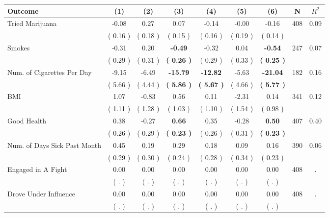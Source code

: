 \begin{tabular}{lcccccccc}
\toprule
 \textbf{Outcome} & \textbf{(1)} & \textbf{(2)} & \textbf{(3)} & \textbf{(4)} & \textbf{(5)} & \textbf{(6)} & \textbf{N} & \textbf{$ R^2$} \\
\midrule
Tried Marijuana &     -0.08 &      0.27 &      0.07 &     -0.14 &     -0.00 &     -0.16 & 408 &       0.09 \\ 
 & (     0.16 ) & (     0.18 ) & (     0.15 ) & (     0.16 ) & (     0.19 ) & (     0.14 ) & \\
Smokes &     -0.31 &      0.20 & \textbf{    -0.49} &     -0.32 &      0.04 & \textbf{    -0.54} & 247 &       0.07 \\ 
 & (     0.29 ) & (     0.31 ) & \textbf{(     0.26 )} & (     0.29 ) & (     0.33 ) & \textbf{(     0.25 )} & \\
Num. of Cigarettes Per Day &     -9.15 &     -6.49 & \textbf{   -15.79} & \textbf{   -12.82} &     -5.63 & \textbf{   -21.04} & 182 &       0.16 \\ 
 & (     5.66 ) & (     4.44 ) & \textbf{(     5.86 )} & \textbf{(     5.67 )} & (     4.66 ) & \textbf{(     5.77 )} & \\
BMI &      1.07 &     -0.83 &      0.56 &      0.11 &     -2.31 &      0.14 & 341 &       0.12 \\ 
 & (     1.11 ) & (     1.28 ) & (     1.03 ) & (     1.10 ) & (     1.54 ) & (     0.98 ) & \\
Good Health &      0.38 &     -0.27 & \textbf{     0.66} &      0.35 &     -0.28 & \textbf{     0.50} & 407 &       0.40 \\ 
 & (     0.26 ) & (     0.29 ) & \textbf{(     0.23 )} & (     0.26 ) & (     0.31 ) & \textbf{(     0.23 )} & \\
Num. of Days Sick Past Month &      0.45 &      0.19 &      0.29 &      0.18 &      0.09 &      0.16 & 390 &       0.06 \\ 
 & (     0.29 ) & (     0.30 ) & (     0.24 ) & (     0.28 ) & (     0.34 ) & (     0.23 ) & \\
Engaged in A Fight &      0.00 &      0.00 &      0.00 &      0.00 &      0.00 &      0.00 & 408 &          . \\ 
 & (        . ) & (        . ) & (        . ) & (        . ) & (        . ) & (        . ) & \\
Drove Under Influence &      0.00 &      0.00 &      0.00 &      0.00 &      0.00 &      0.00 & 408 &          . \\ 
 & (        . ) & (        . ) & (        . ) & (        . ) & (        . ) & (        . ) & \\

\end{tabular}
